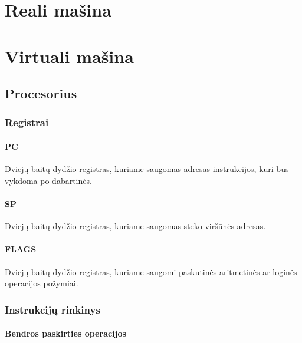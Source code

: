 \documentclass{scrartcl}
\begin{document}
    \section{Reali mašina}

    \pagebreak

    \section{Virtuali mašina}
        \subsection{Procesorius}
            \subsubsection{Registrai}
                \paragraph{PC}
                    Dviejų baitų dydžio registras, kuriame saugomas adresas instrukcijos, kuri bus vykdoma po dabartinės.
                \paragraph{SP}
                    Dviejų baitų dydžio registras, kuriame saugomas steko viršūnės adresas.
                \paragraph{FLAGS}
                    Dviejų baitų dydžio registras, kuriame saugomi paskutinės aritmetinės ar loginės operacijos požymiai.

                    

            \subsubsection{Instrukcijų rinkinys}
                \paragraph{Bendros paskirties operacijos}
                    \vspace{1em}
\end{document}

